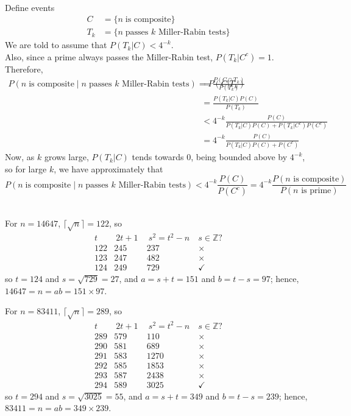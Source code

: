 \documentclass[11pt]{article}
\begin{document}
\bigskip{}\\
Define events
\begin{align*}
  C   &= \{n\;\text{is composite}\}\\
  T_k &= \{n\;\text{passes $k$ Miller-Rabin tests}\}
\end{align*}
We are told to assume that $P(T_k|C) < 4^{-k}$.\\
Also, since a prime always passes the Miller-Rabin test, $P(T_k|C^c) = 1$.
Therefore,
\begin{align*}
     P(n\;\text{is composite}\;|\;n\;\text{passes $k$ Miller-Rabin tests})
   = P(C|T_k)
  &= \frac{P(C\cap T_k)}{P(T_k)}\\
  &= \frac{P(T_k|C)P(C)}{P(T_k)}\\
  &< 4^{-k}\frac{P(C)}{P(T_k|C)P(C) + P(T_k|C^c)P(C^c)}\\
  &= 4^{-k}\frac{P(C)}{P(T_k|C)P(C) + P(C^c)}
\end{align*}
Now, as $k$ grows large,
$P(T_k|C)$ tends towards 0, being bounded above by $4^{-k}$,
so for large $k$, we have approximately that
\[
     P(n\;\text{is composite}\;|\;n\;\text{passes $k$ Miller-Rabin tests})
   < 4^{-k}\frac{P(C)}{P(C^c)}
   = 4^{-k}\frac{P(\text{$n$ is composite})}{P(\text{$n$ is prime})}
\]

\\
For $n = 14647$, $\lceil\sqrt{n}\rceil = 122$, so
\[
  \begin{array}{cccc}
     t  &\  2t + 1 \ &\  s^2 = t^2 -n\  & s\in\mathbb{Z}\text{?} \\\hline
    122 &    245     &      237         & \times \\
    123 &    247     &      482         & \times \\
    124 &    249     &      729         & \checkmark
  \end{array}
\]
so $t = 124$ and $s = \sqrt{729} = 27$, and $a = s + t = 151$ and $b = t - s = 97$;
hence, $14647 = n = ab = 151\times 97$.

For $n = 83411$, $\lceil\sqrt{n}\rceil = 289$, so
\[
  \begin{array}{cccc}
     t  &\  2t + 1 \ &\  s^2 = t^2 -n\  & s\in\mathbb{Z}\text{?} \\\hline
    289 &    579     &      110         & \times \\
    290 &    581     &      689         & \times \\
    291 &    583     &     1270         & \times \\
    292 &    585     &     1853         & \times \\
    293 &    587     &     2438         & \times \\
    294 &    589     &     3025         & \checkmark
  \end{array}
\]
so $t = 294$ and $s = \sqrt{3025} = 55$, and $a = s + t = 349$ and $b = t - s = 239$;
hence, $83411 = n = ab = 349\times 239$.
\end{document}
